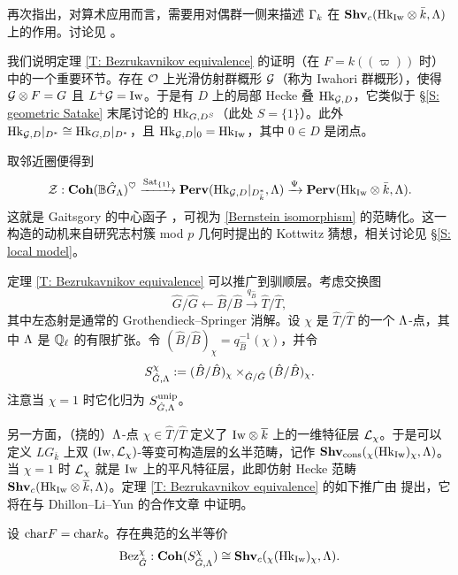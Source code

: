 \begin{rmk}
再次指出，对算术应用而言，需要用对偶群一侧来描述 ${\Gamma}_k$ 在 ${\mathbf{Shv}}_{c}({\operatorname{Hk}}_{{\operatorname{Iw}}}\otimes\bar k,{\Lambda})$ 上的作用。讨论见 \cite{Bezrukavnikov-Affine-Hecke, Hemo-Zhu-Unipotent}。
\end{rmk}

我们说明定理 \ref{T: Bezrukavnikov equivalence} 的证明（在 $F=k(\!(\varpi)\!)$ 时）中的一个重要环节。存在 ${\mathcal O}$ 上光滑仿射群概形 ${\mathcal G}$（称为 Iwahori 群概形），使得 ${\mathcal G}\otimes F=G$ 且 $L^+{\mathcal G}={\operatorname{Iw}}$。于是有 $D$ 上的局部 Hecke 叠 ${\operatorname{Hk}}_{{\mathcal G},D}$，它类似于 \S\ref{S: geometric Satake} 末尾讨论的 ${\operatorname{Hk}}_{G,D^S}$（此处 $S=\{1\}$）。此外 ${\operatorname{Hk}}_{{\mathcal G},D}|_{D^*}\cong {\operatorname{Hk}}_{G,D}|_{D^*}$，且 ${\operatorname{Hk}}_{{\mathcal G},D}|_0={\operatorname{Hk}}_{{\operatorname{Iw}}}$，其中 $0\in D$ 是闭点。

取邻近圈便得到
\begin{equation}\label{E: central sheaf}
{\mathcal Z}: {\mathbf{Coh}}({\mathbb B}\hat{G}_{\Lambda})^\heartsuit\xrightarrow{{\operatorname{Sat}}_{\{1\}}} {\mathbf{Perv}}({\operatorname{Hk}}_{{\mathcal G},D}|_{D^*_{\bar k}},{\Lambda})\xrightarrow{\Psi} {\mathbf{Perv}}({\operatorname{Hk}}_{{\operatorname{Iw}}}\otimes \bar k,{\Lambda}).
\end{equation}
这就是 Gaitsgory 的中心函子 \cite{Gaitsgory-Central-Sheaf, Zhu-Coherence-Conjecture}，可视为 \eqref{Bernstein isomorphism} 的范畴化。这一构造的动机来自研究志村簇 mod $p$ 几何时提出的 Kottwitz 猜想，相关讨论见 \S\ref{S: local model}。

定理 \ref{T: Bezrukavnikov equivalence} 可以推广到驯顺层。考虑交换图
\[
\hat{G}/\hat{G}\leftarrow \hat{B}/\hat{B}\xrightarrow{q_{\hat{B}}} \hat{T}/\hat{T},
\]
其中左态射是通常的 Grothendieck--Springer 消解。设 $\chi$ 是 $\hat{T}/\hat{T}$ 的一个 ${\Lambda}$-点，其中 ${\Lambda}$ 是 ${\mathbb Q}_\ell$ 的有限扩张。令 $(\hat{B}/\hat{B})_\chi=q_{\hat{B}}^{-1}(\chi)$，并令
\[
S^{\chi}_{\hat{G},{\Lambda}}:= (\hat{B}/\hat{B})_\chi\times_{\hat{G}/\hat{G}} (\hat{B}/\hat{B})_\chi.
\]
注意当 $\chi=1$ 时它化归为 $S^{{\operatorname{unip}}}_{\hat{G},{\Lambda}}$。

另一方面，（挠的）${\Lambda}$-点 $\chi\in \hat{T}/\hat{T}$ 定义了 ${\operatorname{Iw}}\otimes\overline{k}$ 上的一维特征层 ${\mathcal L}_\chi$。于是可以定义 $LG_{\bar k}$ 上双 $({\operatorname{Iw}},{\mathcal L}_\chi)$-等变可构造层的幺半范畴，记作 ${\mathbf{Shv}}_{{\operatorname{cons}}}({}_\chi({\operatorname{Hk}}_{{\operatorname{Iw}}})_{\chi},{\Lambda})$。当 $\chi=1$ 时 ${\mathcal L}_\chi$ 就是 ${\operatorname{Iw}}$ 上的平凡特征层，此即仿射 Hecke 范畴 ${\mathbf{Shv}}_c({\operatorname{Hk}}_{{\operatorname{Iw}}}\otimes\overline k,{\Lambda})$。定理 \ref{T: Bezrukavnikov equivalence} 的如下推广由 \cite{Bezrukavnikov-Affine-Hecke} 提出，它将在与 Dhillon--Li--Yun 的合作文章 \cite{DLYZ-Endoscopy} 中证明。

\begin{thm} \label{T: Monodromic Bezrukavnikov equivalence}
设 ${\operatorname{char}} F={\operatorname{char}} k$。存在典范的幺半等价
\[
\operatorname{Bez}^{\chi}_{\hat{G}}: {\mathbf{Coh}}(S^{\chi}_{\hat{G},{\Lambda}})\cong {\mathbf{Shv}}_{c}({}_\chi({\operatorname{Hk}}_{{\operatorname{Iw}}})_{\chi},{\Lambda}).
\]
\end{thm}


